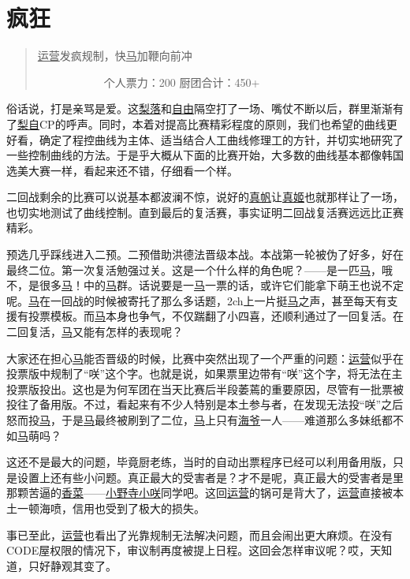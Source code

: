 \chapter{疯狂}
\begin{quote}
\uline{运营}发疯规制，快\uline{马}加鞭向前冲

　　　　　　个人票力：200 厨团合计：450+
\end{quote}

俗话说，打是亲骂是爱。这\uline{梨落}和\uline{自由}隔空打了一场、嘴仗不断以后，群里渐渐有了\uline{梨}\uline{自}CP的呼声。同时，本着对提高比赛精彩程度的原则，我们也希望的曲线更好看，确定了程控曲线为主体、适当结合人工曲线修理工的方针，并切实地研究了一些控制曲线的方法。于是乎大概从下面的比赛开始，大多数的曲线基本都像韩国选美大赛一样，看起来还不错，仔细看一个样。

二回战剩余的比赛可以说基本都波澜不惊，说好的\uline{真帆}让\uline{真姬}也就那样让了一场，也切实地测试了曲线控制。直到最后的复活赛，事实证明二回战复活赛远远比正赛精彩。

预选几乎踩线进入二预。二预借助洪德法晋级本战。本战第一轮被伪了好多，好在最终二位。第一次复活勉强过关。这是一个什么样的角色呢？——是一匹\uline{马}，哦不，是很多\uline{马}！中的\uline{马}群。话说要是一\uline{马}一票的话，或许它们能拿下萌王也说不定呢。\uline{马}在一回战的时候被寄托了那么多话题，2ch上一片挺\uline{马}之声，甚至每天有支援有投票模板。而\uline{马}本身也争气，不仅踹翻了小四喜，还顺利通过了一回复活。在二回复活，\uline{马}又能有怎样的表现呢？

大家还在担心\uline{马}能否晋级的时候，比赛中突然出现了一个严重的问题：\uline{运营}似乎在投票版中规制了“咲”这个字。也就是说，如果票里边带有“咲”这个字，将无法在主投票版投出。这也是为何军团在当天比赛后半段萎蔫的重要原因，尽管有一批票被投往了备用版。不过，看起来有不少人特别是本土参与者，在发现无法投“咲”之后怒而投\uline{马}，于是\uline{马}最终被刷到了二位，\uline{马}上只有\uline{海爷}一人——难道那么多妹纸都不如\uline{马}萌吗？

这还不是最大的问题，毕竟厨老练，当时的自动出票程序已经可以利用备用版，只是设置上还有些小问题。真正最大的受害者是？才不是呢，真正最大的受害者是里那颗苦逼的\uline{香菜}——\uline{小野寺小咲}同学吧。这回\uline{运营}的锅可是背大了，\uline{运营}直接被本土一顿海喷，信用也受到了极大的损失。

事已至此，\uline{运营}也看出了光靠规制无法解决问题，而且会闹出更大麻烦。在没有CODE屋权限的情况下，审议制再度被提上日程。这回会怎样审议呢？哎，天知道，只好静观其变了。


